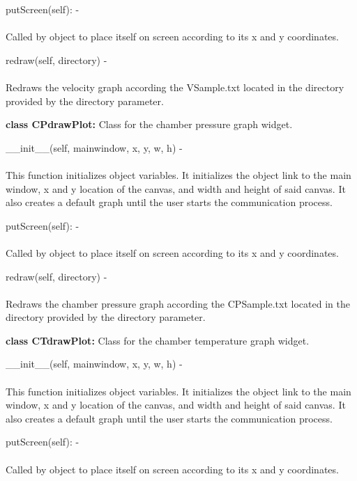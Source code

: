 \documentclass[10pt,draftclsnofoot,onecolumn,compsoc]{IEEEtran}
\begin{document}
putScreen(self): - \\ \\
Called by object to place itself on screen according to its x and y coordinates. \par

redraw(self, directory) - \\ \\
Redraws the velocity graph according the VSample.txt located in the directory provided by the directory parameter. \par

{\bf class CPdrawPlot: }  Class for the chamber pressure graph widget. \par

\_\_init\_\_(self, mainwindow, x, y, w, h) - \\ \\
This function initializes object variables. It initializes the object link to the main window, x and y location of the canvas, and width and height of said canvas. It also creates a default graph until the user starts the communication process. \par

putScreen(self): - \\ \\
Called by object to place itself on screen according to its x and y coordinates. \par

redraw(self, directory) - \\ \\
Redraws the chamber pressure graph according the CPSample.txt located in the directory provided by the directory parameter. \par

{\bf class CTdrawPlot: }  Class for the chamber temperature graph widget. \par

\_\_init\_\_(self, mainwindow, x, y, w, h) - \\ \\
This function initializes object variables. It initializes the object link to the main window, x and y location of the canvas, and width and height of said canvas. It also creates a default graph until the user starts the communication process. \par

putScreen(self): - \\ \\
Called by object to place itself on screen according to its x and y coordinates. \par
\end{document}
